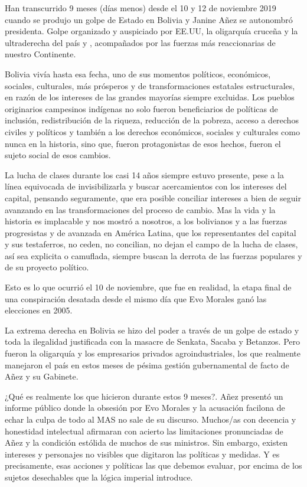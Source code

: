 \documentclass[a4paper, nobind]{templates/ociamthesis}
\begin{document}
Han transcurrido 9 meses (días menos) desde el 10 y 12 de noviembre 2019 cuando se produjo un golpe de Estado en Bolivia y Janine Añez se autonombró presidenta. Golpe organizado y auspiciado por EE.UU, la oligarquía cruceña y la ultraderecha del país y , acompañados por las fuerzas más reaccionarias de nuestro Continente.

Bolivia vivía hasta esa fecha, uno de sus momentos políticos, económicos, sociales, culturales, más prósperos y de transformaciones estatales estructurales, en razón de los intereses de las grandes mayorías siempre excluidas. Los pueblos originarios campesinos indígenas no solo fueron beneficiarios de políticas de inclusión, redistribución de la riqueza, reducción de la pobreza, acceso a derechos civiles y políticos y también a los derechos económicos, sociales y culturales como nunca en la historia, sino que, fueron protagonistas de esos hechos, fueron el sujeto social de esos cambios.

La lucha de clases durante los casi 14 años siempre estuvo presente, pese a la línea equivocada de invisibilizarla y buscar acercamientos con los intereses del capital, pensando seguramente, que era posible conciliar intereses a bien de seguir avanzando en las transformaciones del proceso de cambio. Mas la vida y la historia es implacable y nos mostró a nosotros, a los bolivianos y a las fuerzas progresistas y de avanzada en América Latina, que los representantes del capital y sus testaferros, no ceden, no concilian, no dejan el campo de la lucha de clases, así sea explicita o camuflada, siempre buscan la derrota de las fuerzas populares y de su proyecto político.

Esto es lo que ocurrió el 10 de noviembre, que fue en realidad, la etapa final de una conspiración desatada desde el mismo día que Evo Morales ganó las elecciones en 2005.

La extrema derecha en Bolivia se hizo del poder a través de un golpe de estado y toda la ilegalidad justificada con la masacre de Senkata, Sacaba y Betanzos. Pero fueron la oligarquía y los empresarios privados agroindustriales, los que realmente manejaron el país en estos meses de pésima gestión gubernamental de facto de Añez y su Gabinete.

¿Qué es realmente los que hicieron durante estos 9 meses?. Añez presentó un informe público donde la obsesión por Evo Morales y la acusación facilona de echar la culpa de todo al MAS no sale de su discurso. Muchos/as con decencia y honestidad intelectual afirmaran con acierto las limitaciones pronunciadas de Añez y la condición estólida de muchos de sus ministros. Sin embargo, existen intereses y personajes no visibles que digitaron las políticas y medidas. Y es precisamente, esas acciones y políticas las que debemos evaluar, por encima de los sujetos desechables que la lógica imperial introduce.
\end{document}
